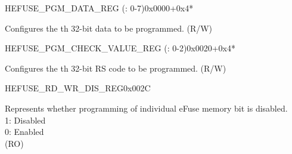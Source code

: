 \begin{register}{H}{EFUSE\_PGM\_DATA\_REG (: 0-7)}{0x0000+0x4*}\label{regdesc:EFUSEPGMDATANREG}
%
\regnewline%
\begin{regdesc}\begin{reglist}
\label{fielddesc:EFUSEPGMDATAN}\item [EFUSE\_PGM\_DATA\_\regindex{n}] Configures the th 32-bit data to be programmed. (R/W)
\end{reglist}\end{regdesc}
\end{register}


\begin{register}{H}{EFUSE\_PGM\_CHECK\_VALUE\_REG (: 0-2)}{0x0020+0x4*}\label{regdesc:EFUSEPGMCHECKVALUEMREG}
%
\regnewline%
\begin{regdesc}\begin{reglist}
\label{fielddesc:EFUSEPGMRSDATAM}\item [EFUSE\_PGM\_RS\_DATA\_\regindex{m}] Configures the th 32-bit RS code to be programmed. (R/W)
\end{reglist}\end{regdesc}
\end{register}


\begin{register}{H}{EFUSE\_RD\_WR\_DIS\_REG}{0x002C}\label{regdesc:EFUSERDWRDISREG}
%
\regnewline%
\begin{regdesc}\begin{reglist}
\label{fielddesc:EFUSEWRDIS}\item [EFUSE\_WR\_DIS] Represents whether programming of individual eFuse memory bit is disabled.\\
1: Disabled\\
0: Enabled\\
(RO)
\end{reglist}\end{regdesc}
\end{register}


